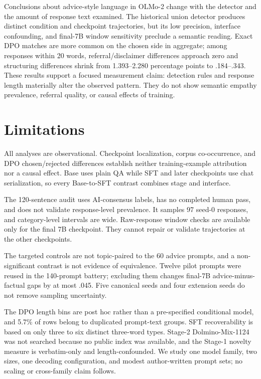 \documentclass[11pt]{article}
\begin{document}
Conclusions about advice-style language in OLMo-2 change with the detector and
the amount of response text examined. The historical union detector produces
distinct condition and checkpoint trajectories, but its low precision,
interface confounding, and final-7B window sensitivity preclude a semantic
reading. Exact DPO matches are more common on the chosen side in aggregate;
among responses within 20 words, referral/disclaimer differences approach zero
and structuring differences shrink from 1.393--2.280 percentage points to
.184--.343. These results support a focused measurement claim: detection rules
and response length materially alter the observed pattern. They do not show
semantic empathy prevalence, referral quality, or causal effects of training.

\section{Limitations}
\label{sec:limitations}

All analyses are observational. Checkpoint localization, corpus co-occurrence,
and DPO chosen/rejected differences establish neither training-example
attribution nor a causal effect. Base uses plain QA while SFT and later
checkpoints use chat serialization, so every Base-to-SFT contrast combines
stage and interface.

The 120-sentence audit uses AI-consensus labels, has no completed human pass,
and does not validate response-level prevalence. It samples 97 seed-0 responses,
and category-level intervals are wide. Raw-response window checks are available
only for the final 7B checkpoint. They cannot repair or validate trajectories at
the other checkpoints.

The targeted controls are not topic-paired to the 60 advice prompts, and a
non-significant contrast is not evidence of equivalence. Twelve pilot prompts
were reused in the 140-prompt battery; excluding them changes final-7B
advice-minus-factual gaps by at most .045. Five canonical seeds and four
extension seeds do not remove sampling uncertainty.

The DPO length bins are post hoc rather than a pre-specified conditional model,
and 5.7\% of rows belong to duplicated prompt-text groups. SFT recoverability is
based on only three to six distinct three-word types. Stage-2 Dolmino-Mix-1124
was not searched because no public index was available, and the Stage-1 novelty
measure is verbatim-only and length-confounded. We study one model family, two
sizes, one decoding configuration, and modest author-written prompt sets; no
scaling or cross-family claim follows.
\end{document}
